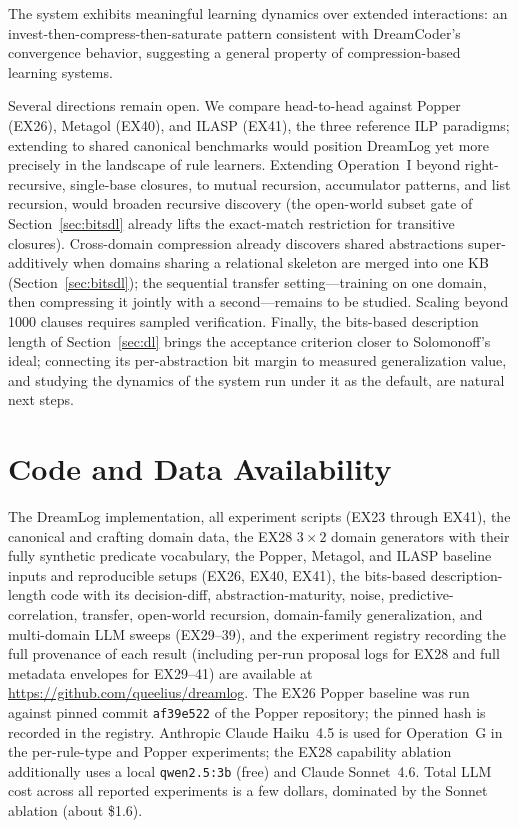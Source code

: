 \documentclass[10pt,conference]{IEEEtran}
\begin{document}
The system exhibits meaningful learning dynamics over extended interactions: an invest-then-compress-then-saturate pattern consistent with DreamCoder's convergence behavior, suggesting a general property of compression-based learning systems.

Several directions remain open. We compare head-to-head against Popper (EX26), Metagol (EX40), and ILASP (EX41), the three reference ILP paradigms; extending to shared canonical benchmarks would position DreamLog yet more precisely in the landscape of rule learners. Extending Operation~I beyond right-recursive, single-base closures, to mutual recursion, accumulator patterns, and list recursion, would broaden recursive discovery (the open-world subset gate of Section~\ref{sec:bitsdl} already lifts the exact-match restriction for transitive closures). Cross-domain compression already discovers shared abstractions super-additively when domains sharing a relational skeleton are merged into one KB (Section~\ref{sec:bitsdl}); the sequential transfer setting---training on one domain, then compressing it jointly with a second---remains to be studied. Scaling beyond 1000 clauses requires sampled verification. Finally, the bits-based description length of Section~\ref{sec:dl} brings the acceptance criterion closer to Solomonoff's ideal; connecting its per-abstraction bit margin to measured generalization value, and studying the dynamics of the system run under it as the default, are natural next steps.

\section*{Code and Data Availability}

The DreamLog implementation, all experiment scripts (EX23 through EX41), the canonical and crafting domain data, the EX28 $3\times2$ domain generators with their fully synthetic predicate vocabulary, the Popper, Metagol, and ILASP baseline inputs and reproducible setups (EX26, EX40, EX41), the bits-based description-length code with its decision-diff, abstraction-maturity, noise, predictive-correlation, transfer, open-world recursion, domain-family generalization, and multi-domain LLM sweeps (EX29--39), and the experiment registry recording the full provenance of each result (including per-run proposal logs for EX28 and full metadata envelopes for EX29--41) are available at \url{https://github.com/queelius/dreamlog}. The EX26 Popper baseline was run against pinned commit \texttt{af39e522} of the Popper repository; the pinned hash is recorded in the registry. Anthropic Claude Haiku~4.5 is used for Operation~G in the per-rule-type and Popper experiments; the EX28 capability ablation additionally uses a local \texttt{qwen2.5:3b} (free) and Claude Sonnet~4.6. Total LLM cost across all reported experiments is a few dollars, dominated by the Sonnet ablation (about \$1.6).




\end{document}
